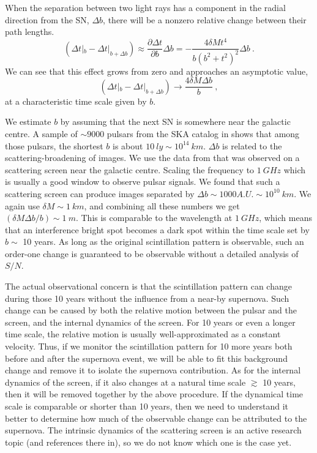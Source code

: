 \documentclass[aps,showpacs,onecolumn,floats,prd,superscriptaddress,nofootinbib]{revtex4-1}
\begin{document}
When the separation between two light rays has a component in the radial direction from the SN, $\Delta b$, there will be a nonzero relative change between their path lengths.
\begin{equation}
	(\Delta t|_b - \Delta t|_{b+\Delta b}) \approx 
	\frac{\partial \Delta t}{\partial b} \Delta b 
	= - \frac{4\delta Mt^4}{b(b^2 + t^2)^2} \Delta b~.
	\label{eq-change}
\end{equation}
We can see that this effect grows from zero and approaches an asymptotic value,
\begin{equation}
	(\Delta t|_b - \Delta t|_{b+\Delta b}) 
	\longrightarrow \frac{4\delta M \Delta b}{b}~,	\label{pulsescint}
\end{equation}
at a characteristic time scale given by $b$.

We estimate $b$ by assuming that the next SN is somewhere near the galactic centre. 
A sample of $\sim 9000$ pulsars from the SKA catalog in \cite{MSPpopulation} shows that among those pulsars, the shortest $b$ is about $10\ ly \sim 10^{14} \ km$. 
$\Delta b$ is related to the scattering-broadening of images. 
We use the data from \cite{BowBel13} that was observed on a scattering screen near the galactic centre. 
Scaling the frequency to $1\ GHz$ which is usually a good window to observe pulsar signals. 
We found that such a scattering screen can produce images separated by $\Delta b\sim 1000A.U. \sim 10^{10} \ km$. 
We again use $\delta M \sim 1 \ km$, and combining all these numbers we get $(\delta M \Delta b / b) \sim 1 \ m$. 
This is comparable to the wavelength at $1 \ GHz$, which means that an interference bright spot becomes a dark spot within the time scale set by $b\sim$ 10 years. 
As long as the original scintillation pattern is observable, such an order-one change is guaranteed to be observable without a detailed analysis of $S/N$.

The actual observational concern is that the scintillation pattern can change during those 10 years without the influence from a near-by supernova.
Such change can be caused by both the relative motion between the pulsar and the screen, and the internal dynamics of the screen.
For 10 years or even a longer time scale, the relative motion is usually well-approximated as a constant velocity.
Thus, if we monitor the scintillation pattern for 10 more years both before and after the supernova event, we will be able to fit this background change and remove it to isolate the supernova contribution.
As for the internal dynamics of the screen, if it also changes at a natural time scale $\gtrsim$ 10 years, then it will be removed together by the above procedure.
If the dynamical time scale is comparable or shorter than 10 years, then we need to understand it better to determine how much of the observable change can be attributed to the supernova.
The intrinsic dynamics of the scattering screen is an active research topic \cite{Liu:2015, Pen:2013} (and references there in), so we do not know which one is the case yet.
\end{document}
